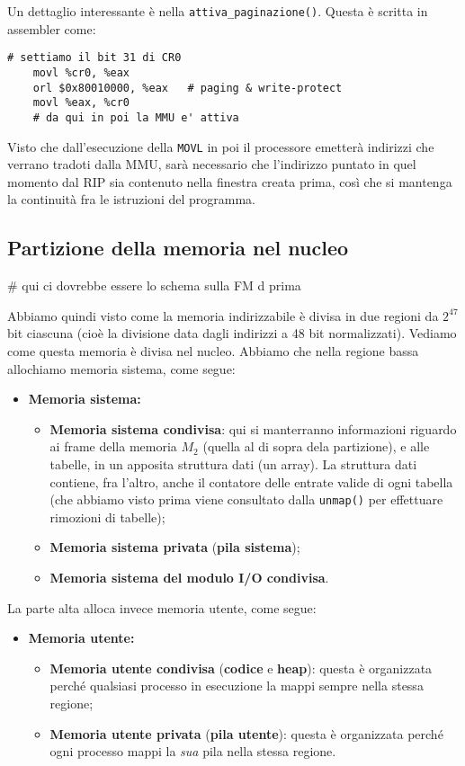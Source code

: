 \documentclass[a4paper,11pt]{article}
\begin{document}
Un dettaglio interessante è nella \lstinline|attiva_paginazione()|.
Questa è scritta in assembler come:
\begin{lstlisting}[language=aSSembler, style=codestyle]	
# settiamo il bit 31 di CR0
	movl %cr0, %eax
	orl $0x80010000, %eax	# paging & write-protect
	movl %eax, %cr0
	# da qui in poi la MMU e' attiva
\end{lstlisting}
Visto che dall'esecuzione della \lstinline|MOVL| in poi il processore emetterà indirizzi che verrano tradoti dalla MMU, sarà necessario che l'indirizzo puntato in quel momento dal RIP sia contenuto nella finestra creata prima, così che si mantenga la continuità fra le istruzioni del programma.

\subsection{Partizione della memoria nel nucleo}
# qui ci dovrebbe essere lo schema sulla FM d prima

Abbiamo quindi visto come la memoria indirizzabile è divisa in due regioni da $2^47$ bit ciascuna (cioè la divisione data dagli indirizzi a 48 bit normalizzati).
Vediamo come questa memoria è divisa nel nucleo.
Abbiamo che nella regione bassa allochiamo memoria sistema, come segue:
\begin{itemize}
	\item \textbf{Memoria sistema:}
		\begin{itemize}
			\item \textbf{Memoria sistema condivisa}: qui si manterranno informazioni riguardo ai frame della memoria $M_2$ (quella al di sopra dela partizione), e alle tabelle, in un apposita struttura dati (un array).
La struttura dati contiene, fra l'altro, anche il contatore delle entrate valide di ogni tabella (che abbiamo visto prima viene consultato dalla \lstinline|unmap()| per effettuare rimozioni di tabelle);
	
\item \textbf{Memoria sistema privata} (\textbf{pila sistema});
\item \textbf{Memoria sistema del modulo I/O condivisa}.
		\end{itemize}
\end{itemize}

La parte alta alloca invece memoria utente, come segue:
\begin{itemize}
	\item \textbf{Memoria utente:}
		\begin{itemize}
			\item \textbf{Memoria utente condivisa} (\textbf{codice} e \textbf{heap}): questa è organizzata perché qualsiasi processo in esecuzione la mappi sempre nella stessa regione;
			\item \textbf{Memoria utente privata} (\textbf{pila utente}): questa è organizzata perché ogni processo mappi la \textit{sua} pila nella stessa regione.
		\end{itemize}
\end{itemize}
\end{document}
